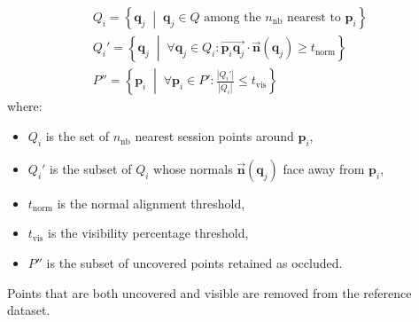 \begin{equation}
\label{eq:4_visibility}
\begin{gathered}
Q_i = \left\{\mathbf{q}_j \;\middle|\; \mathbf{q}_j \in Q \text{ among the } n_\text{nb} \text{ nearest to } \mathbf{p}_i \right\} \\
Q_i' = \left\{\mathbf{q}_j \;\middle|\; \forall \mathbf{q}_j \in Q_i: \overrightarrow{\mathbf{p}_i\mathbf{q}_j} \cdot \vec{\mathbf{n}}(\mathbf{q}_j) \geq t_\text{norm}\right\} \\
P'' = \left \{ \mathbf{p}_i \;\middle|\; \forall \mathbf{p}_i \in P': \frac{|Q_i'|}{|Q_i|} \leq t_\text{vis}\right\}
\end{gathered}
\end{equation}
where:
\begin{itemize}
    \item $Q_i$ is the set of $n_\text{nb}$ nearest session points around $\mathbf{p}_i$,
    \item $Q_i'$ is the subset of $Q_i$ whose normals $\vec{\mathbf{n}}(\mathbf{q}_j)$ face away from $\mathbf{p}_i$,
    \item $t_\text{norm}$ is the normal alignment threshold,
    \item $t_\text{vis}$ is the visibility percentage threshold,
    \item $P''$ is the subset of uncovered points retained as occluded.
\end{itemize}
Points that are both uncovered and visible are removed from the reference dataset.


